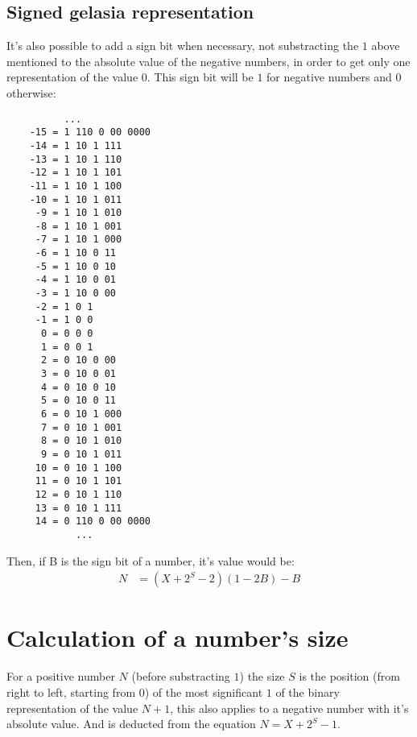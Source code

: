 \documentclass[a4paper,11pt]{article}
\begin{document}
\subsection{Signed gelasia representation}
It's also possible to add a sign bit when necessary, not substracting the $1$ above mentioned to the absolute value of the negative numbers, in order to get only one representation of the value $0$. This sign bit will be $1$ for negative numbers and $0$ otherwise:
\begin{center} \begin{lstlisting}
	      ...
	-15 = 1 110 0 00 0000 
	-14 = 1 10 1 111 
	-13 = 1 10 1 110 
	-12 = 1 10 1 101 
	-11 = 1 10 1 100 
	-10 = 1 10 1 011 
	 -9 = 1 10 1 010 
	 -8 = 1 10 1 001 
	 -7 = 1 10 1 000 
	 -6 = 1 10 0 11 
	 -5 = 1 10 0 10 
	 -4 = 1 10 0 01 
	 -3 = 1 10 0 00
	 -2 = 1 0 1
	 -1 = 1 0 0 
	  0 = 0 0 0 
	  1 = 0 0 1
	  2 = 0 10 0 00
	  3 = 0 10 0 01 
	  4 = 0 10 0 10 
	  5 = 0 10 0 11 
	  6 = 0 10 1 000 
	  7 = 0 10 1 001 
	  8 = 0 10 1 010 
	  9 = 0 10 1 011 
	 10 = 0 10 1 100 
	 11 = 0 10 1 101 
	 12 = 0 10 1 110 
	 13 = 0 10 1 111 
	 14 = 0 110 0 00 0000 
	        ...	
\end{lstlisting} \end{center}
Then, if B is the sign bit of a number, it's value would be:
\begin{align*}
	N&= (X+2^{S}-2)(1-2B)-B
\end{align*}

\section{Calculation of a number's size}
For a positive number $N$ (before substracting $1$) the size $S$ is the position (from right to left, starting from $0$) of the most significant $1$ of the binary representation of the value $N+1$, this also applies to a negative number with it's absolute value. And is deducted from the equation $N = X+2^{S}-1$.
\end{document}
